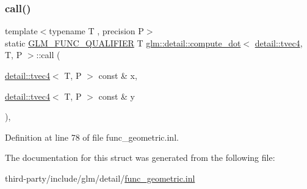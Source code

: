 \subsubsection{\texorpdfstring{call()}{call()}}
{\footnotesize\ttfamily template$<$typename T , precision P$>$ \\
static \hyperlink{setup_8hpp_a33fdea6f91c5f834105f7415e2a64407}{G\+L\+M\+\_\+\+F\+U\+N\+C\+\_\+\+Q\+U\+A\+L\+I\+F\+I\+ER} T \hyperlink{structglm_1_1detail_1_1compute__dot}{glm\+::detail\+::compute\+\_\+dot}$<$ \hyperlink{structglm_1_1detail_1_1tvec4}{detail\+::tvec4}, T, P $>$\+::call (\begin{DoxyParamCaption}\item[{\hyperlink{structglm_1_1detail_1_1tvec4}{detail\+::tvec4}$<$ T, P $>$ const \&}]{x,  }\item[{\hyperlink{structglm_1_1detail_1_1tvec4}{detail\+::tvec4}$<$ T, P $>$ const \&}]{y }\end{DoxyParamCaption})\hspace{0.3cm}{\ttfamily [inline]}, {\ttfamily [static]}}



Definition at line 78 of file func\+\_\+geometric.\+inl.



The documentation for this struct was generated from the following file\+:\begin{DoxyCompactItemize}
\item 
third-\/party/include/glm/detail/\hyperlink{func__geometric_8inl}{func\+\_\+geometric.\+inl}\end{DoxyCompactItemize}
